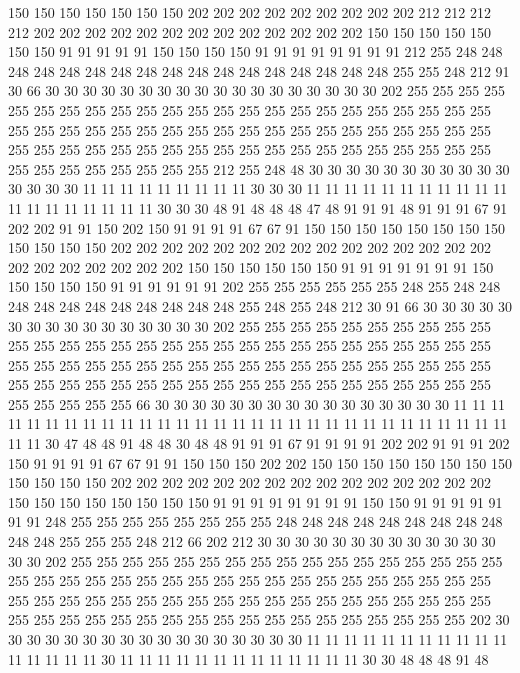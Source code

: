 150 150 150 150 150 150 150 202 202 202 202 202 202 202 202 202 212 212 212 212
202 202 202 202 202 202 202 202 202 202 202 202 202 150 150 150 150 150 150 150
91 91 91 91 91 150 150 150 150 91 91 91 91 91 91 91 91 212 255 248
248 248 248 248 248 248 248 248 248 248 248 248 248 248 248 248 255 255 248 212
91 30 66 30 30 30 30 30 30 30 30 30 30 30 30 30 30 30 30 30
30 202 255 255 255 255 255 255 255 255 255 255 255 255 255 255 255 255 255 255
255 255 255 255 255 255 255 255 255 255 255 255 255 255 255 255 255 255 255 255
255 255 255 255 255 255 255 255 255 255 255 255 255 255 255 255 255 255 255 255
255 255 255 255 255 255 255 255 255 255 255 212 255 248 48 30 30 30 30 30
30 30 30 30 30 30 30 30 30 30 11 11 11 11 11 11 11 11 11 30
30 30 11 11 11 11 11 11 11 11 11 11 11 11 11 11 11 11 11 11
11 30 30 30 48 91 48 48 48 47 48 91 91 91 48 91 91 91 67 91
202 202 91 91 150 202 150 91 91 91 91 67 67 91 150 150 150 150 150 150
150 150 150 150 150 150 202 202 202 202 202 202 202 202 202 202 202 202 202 202
202 202 202 202 202 202 202 202 150 150 150 150 150 150 91 91 91 91 91 91
91 150 150 150 150 150 91 91 91 91 91 91 202 255 255 255 255 255 255 248
255 248 248 248 248 248 248 248 248 248 248 248 255 248 255 248 212 30 91 66
30 30 30 30 30 30 30 30 30 30 30 30 30 30 30 30 202 255 255 255
255 255 255 255 255 255 255 255 255 255 255 255 255 255 255 255 255 255 255 255
255 255 255 255 255 255 255 255 255 255 255 255 255 255 255 255 255 255 255 255
255 255 255 255 255 255 255 255 255 255 255 255 255 255 255 255 255 255 255 255
255 255 255 255 255 255 255 255 255 66 30 30 30 30 30 30 30 30 30 30
30 30 30 30 30 30 11 11 11 11 11 11 11 11 11 11 11 11 11 11
11 11 11 11 11 11 11 11 11 11 11 11 11 11 11 11 11 11 30 47
48 48 91 48 48 30 48 48 91 91 91 67 91 91 91 91 202 202 91 91
91 202 150 91 91 91 91 67 67 91 91 150 150 150 202 202 150 150 150 150
150 150 150 150 150 150 150 150 202 202 202 202 202 202 202 202 202 202 202 202
202 202 202 150 150 150 150 150 150 150 150 91 91 91 91 91 91 91 91 150
150 91 91 91 91 91 91 91 248 255 255 255 255 255 255 255 255 248 248 248
248 248 248 248 248 248 248 248 255 255 255 248 212 66 202 212 30 30 30 30
30 30 30 30 30 30 30 30 30 30 30 202 255 255 255 255 255 255 255 255
255 255 255 255 255 255 255 255 255 255 255 255 255 255 255 255 255 255 255 255
255 255 255 255 255 255 255 255 255 255 255 255 255 255 255 255 255 255 255 255
255 255 255 255 255 255 255 255 255 255 255 255 255 255 255 255 255 255 255 255
255 255 255 255 255 202 30 30 30 30 30 30 30 30 30 30 30 30 30 30
30 30 30 11 11 11 11 11 11 11 11 11 11 11 11 11 11 11 11 30
11 11 11 11 11 11 11 11 11 11 11 11 11 30 30 48 48 48 91 48
